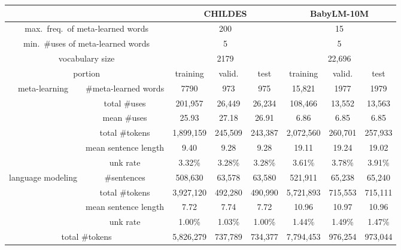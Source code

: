 \documentclass{article}
\begin{document}
\begin{table*}[t]
\small
\begin{center}
\begin{tabular}{cc|ccc|ccc}
\toprule
& & \multicolumn{3}{c|}{\bf CHILDES} & \multicolumn{3}{c}{\bf BabyLM-10M} \\
\midrule
\multicolumn{2}{c|}{max.\ freq.\ of meta-learned words}  & \multicolumn{3}{c|}{200} & \multicolumn{3}{c}{15} \\
\multicolumn{2}{c|}{min.\ \#uses of meta-learned words}  & \multicolumn{3}{c|}{5} & \multicolumn{3}{c}{5} \\
\multicolumn{2}{c|}{vocabulary size}  & \multicolumn{3}{c|}{2179} & \multicolumn{3}{c}{22,696} \\
\midrule
\multicolumn{2}{c|}{portion}                                & training& valid. & test   & training & valid. & test   \\
\midrule
\multirow{6}{3em}{meta-learning}     & \#meta-learned words &    7790 &    973 &    975 &   15,821 &   1977 &   1979 \\
                                     & total \#uses         & 201,957 & 26,449 & 26,234 &  108,466 & 13,552 & 13,563 \\
                                     & mean \#uses          &   25.93 &  27.18 &  26.91 &     6.86 &   6.85 &   6.85 \\
                                     & total \#tokens       &1,899,159& 245,509& 243,387&2,072,560 &260,701 &257,933 \\
                                     & mean sentence length &    9.40 &   9.28 &   9.28 &    19.11 &  19.24 &  19.02 \\
                                     & unk rate             &  3.32\% & 3.28\% & 3.28\% &   3.61\% & 3.78\% & 3.91\% \\
\midrule
\multirow{4}{3em}{language modeling} & \#sentences          & 508,630 & 63,578 & 63,580 &  521,911 & 65,238 & 65,240 \\
                                     & total \#tokens       &3,927,120& 492,280& 490,990&5,721,893 &715,553 &715,111 \\
                                     & mean sentence length &    7.72 &   7.74 &   7.72 &    10.96 &  10.97 &  10.96 \\
                                     & unk rate             &  1.00\% & 1.03\% & 1.00\% &   1.44\% & 1.49\% & 1.47\% \\
\midrule
\multicolumn{2}{c|}{total \#tokens}                         &5,826,279& 737,789& 734,377&7,794,453 &976,254 &973,044 \\

\end{tabular}
\end{center}
\end{table*}
\end{document}
